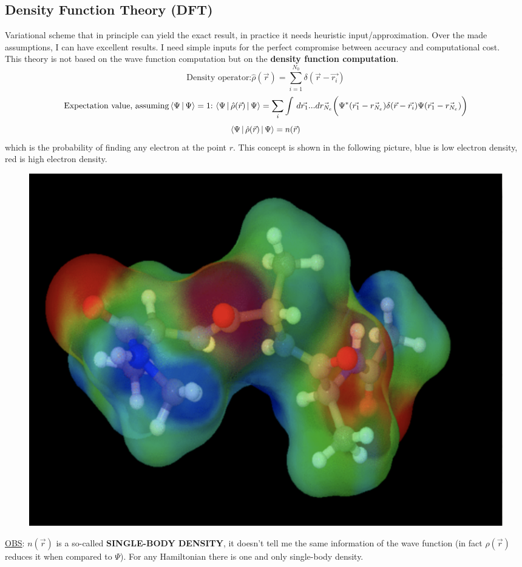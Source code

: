 \subsection{Density Function Theory (DFT)}
Variational scheme that in principle can yield the exact result, in practice it needs heuristic input/approximation. Over the made assumptions, I can have excellent results. I need simple inputs for the perfect compromise between accuracy and computational cost.\\
This theory is not based on the wave function computation but on the \textbf{density function computation}.\\
\[
 \text{Density operator:}\hat{\rho}(\vec{r})=\sum_{i=1}^{N_0}\delta(\vec{r}-\vec{r_i})\]
 \[
\text{Expectation value, assuming} \braket{\Psi\,|\,\Psi}=1 \text{:}\, \braket{\Psi\,|\,\hat{\rho}(\vec{r})\,|\,\Psi}=\sum_i \int\,d\vec{r_1}...d\vec{r_{N_e}}\bigg(\Psi^*(\vec{r_1}-\vec{r_{N_e}})\delta(\vec{r}-\vec{r_i})\Psi(\vec{r_1}-\vec{r_{N_e}})\bigg)
\]
\[
\braket{\Psi\,|\,\hat{\rho}(\vec{r})\,|\,\Psi}=n(\vec{r})
\]
which is the probability of finding any electron at the point $r$. This concept is shown in the following picture, blue is low electron density, red is high electron density.\\
\begin{figure}[htbp!]
	\centering
	\includegraphics[scale=0.30]{img_14}
\end{figure}
\newline
\ul{OBS}: $n(\vec{r})$ is a so-called \textbf{SINGLE-BODY DENSITY}, it doesn't tell me the same information of the wave function (in fact $\hat{\rho}(\vec{r})$ reduces it when compared to $\Psi$). For any Hamiltonian there is one and only single-body density.\\

